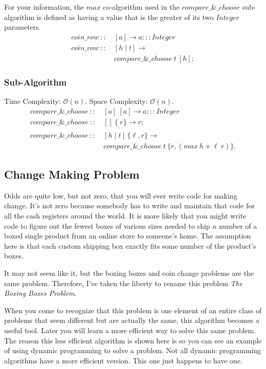 \documentclass[a4paper,10pt]{book}
\begin{document}
For your information, the $max$ co-algorithm used in the $compare\_\&\_choose$ sub-algorithm is defined as having a value that is the greater of its two $Integer$ parameters.
\begin{align*}
coin\_row\ ::\ &[a]\rightarrow a:::Integer\\
coin\_row\ ::\ &[h\mid t]\rightarrow\\
	&compare\_\&\_choose\ t\ [h];
\end{align*}

\subsubsection{Sub-Algorithm}Time Complexity: $\mathcal{O}(n)$. Space Complexity: $\mathcal{O}(n)$.
\begin{align*}
compare\_\&\_choose\ ::\ &[a]\ [a]\rightarrow a:::Integer\\
compare\_\&\_choose\ ::\ &[]\ \{_,r\}\rightarrow r;\\
compare\_\&\_choose\ ::\ &[h\mid t]\ \{\ell,r\}\rightarrow\\	
	&compare\_\&\_choose\ t\ \{r,(max\ h+\ell\ r)\}.
\end{align*}
\subsection{Change Making Problem}

Odds are quite low, but not zero, that you will ever write code for making change. It's not zero because somebody has to write and maintain that code for all the cash registers around the world. It is more likely that you might write code to figure out the fewest boxes of various sizes needed to ship $n$ number of a boxed single product from an online store to someone's home. The assumption here is that each custom shipping box exactly fits some number of the product's boxes. 

It may not seem like it, but the boxing boxes and coin change problems are the same problem. Therefore, I've taken the liberty to rename this problem \textit{The Boxing Boxes Problem}. 

When you come to recognize that this problem is one element of an entire class of problems that seem different but are actually the same, this algorithm becomes a useful tool. Later you will learn a more efficient way to solve this same problem. The reason this less efficient algorithm is shown here is so you can see an example of using dynamic programming to solve a problem. Not all dynamic programming algorithms have a more efficient version. This one just happens to have one.
\end{document}
